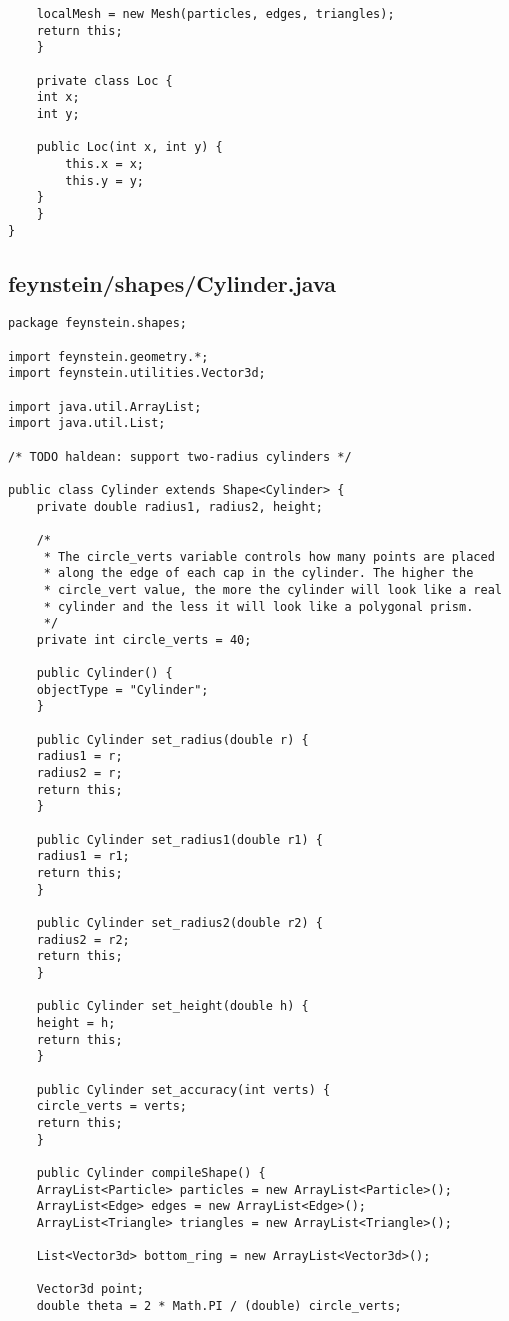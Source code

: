 \begin{lstlisting}
	localMesh = new Mesh(particles, edges, triangles);
	return this;
    }		

    private class Loc {
	int x;
	int y;

	public Loc(int x, int y) {
	    this.x = x;
	    this.y = y;
	}
    }
}\end{lstlisting}

\subsection*{feynstein/shapes/Cylinder.java}
\begin{lstlisting}
package feynstein.shapes;

import feynstein.geometry.*;
import feynstein.utilities.Vector3d;

import java.util.ArrayList;
import java.util.List;

/* TODO haldean: support two-radius cylinders */

public class Cylinder extends Shape<Cylinder> {
    private double radius1, radius2, height;

    /*
     * The circle_verts variable controls how many points are placed
     * along the edge of each cap in the cylinder. The higher the
     * circle_vert value, the more the cylinder will look like a real
     * cylinder and the less it will look like a polygonal prism.
     */
    private int circle_verts = 40;

    public Cylinder() {
	objectType = "Cylinder";
    }
    
    public Cylinder set_radius(double r) {
	radius1 = r;
	radius2 = r;
	return this;
    }

    public Cylinder set_radius1(double r1) {
	radius1 = r1;
	return this;
    }

    public Cylinder set_radius2(double r2) {
	radius2 = r2;
	return this;
    }

    public Cylinder set_height(double h) {
	height = h;
	return this;
    }

    public Cylinder set_accuracy(int verts) {
	circle_verts = verts;
	return this;
    }

    public Cylinder compileShape() {
	ArrayList<Particle> particles = new ArrayList<Particle>();
	ArrayList<Edge> edges = new ArrayList<Edge>();
	ArrayList<Triangle> triangles = new ArrayList<Triangle>();

	List<Vector3d> bottom_ring = new ArrayList<Vector3d>();

	Vector3d point;
	double theta = 2 * Math.PI / (double) circle_verts;
	

\end{lstlisting}
